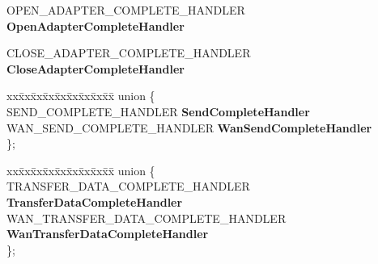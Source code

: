 \begin{DoxyCompactItemize}
\begin{tabbing}
\end{tabbing}\item 
\mbox{\label{struct___n_d_i_s40___p_r_o_t_o_c_o_l___c_h_a_r_a_c_t_e_r_i_s_t_i_c_s_aebb555ac48d18d13b6778a380124bf79}} 
O\+P\+E\+N\+\_\+\+A\+D\+A\+P\+T\+E\+R\+\_\+\+C\+O\+M\+P\+L\+E\+T\+E\+\_\+\+H\+A\+N\+D\+L\+ER {\bfseries Open\+Adapter\+Complete\+Handler}
\item 
\mbox{\label{struct___n_d_i_s40___p_r_o_t_o_c_o_l___c_h_a_r_a_c_t_e_r_i_s_t_i_c_s_af17d94fe06b8dee2cf280e3bf04fc090}} 
C\+L\+O\+S\+E\+\_\+\+A\+D\+A\+P\+T\+E\+R\+\_\+\+C\+O\+M\+P\+L\+E\+T\+E\+\_\+\+H\+A\+N\+D\+L\+ER {\bfseries Close\+Adapter\+Complete\+Handler}
\item 
\mbox{\label{struct___n_d_i_s40___p_r_o_t_o_c_o_l___c_h_a_r_a_c_t_e_r_i_s_t_i_c_s_ae4fd69a8e6ed2be75b9a72cc212fc1aa}} 
\begin{tabbing}
xx\=xx\=xx\=xx\=xx\=xx\=xx\=xx\=xx\=\kill
union \{\\
\>SEND\_COMPLETE\_HANDLER {\bfseries SendCompleteHandler}\\
\>WAN\_SEND\_COMPLETE\_HANDLER {\bfseries WanSendCompleteHandler}\\
\}; \\

\end{tabbing}\item 
\mbox{\label{struct___n_d_i_s40___p_r_o_t_o_c_o_l___c_h_a_r_a_c_t_e_r_i_s_t_i_c_s_a731356694581c74addbc54b1b798f1a2}} 
\begin{tabbing}
xx\=xx\=xx\=xx\=xx\=xx\=xx\=xx\=xx\=\kill
union \{\\
\>TRANSFER\_DATA\_COMPLETE\_HANDLER {\bfseries TransferDataCompleteHandler}\\
\>WAN\_TRANSFER\_DATA\_COMPLETE\_HANDLER {\bfseries WanTransferDataCompleteHandler}\\
\}; \\


\end{tabbing}
\end{DoxyCompactItemize}
